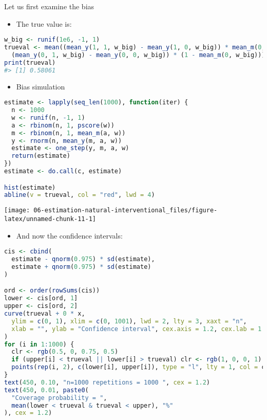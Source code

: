 \documentclass[
  12pt,
]{book}
\providecommand{\tightlist}{%
  \setlength{\itemsep}{0pt}\setlength{\parskip}{0pt}}
\theoremstyle{definition}
\theoremstyle{definition}
\theoremstyle{definition}
\newcommand{\1}{\mathbbm{1}}
\begin{document}
Let us first examine the bias

\begin{itemize}
\tightlist
\item
  The true value is:
\end{itemize}

\begin{lstlisting}[language=R]
w_big <- runif(1e6, -1, 1)
trueval <- mean((mean_y(1, 1, w_big) - mean_y(1, 0, w_big)) * mean_m(0, w_big) +
  (mean_y(0, 1, w_big) - mean_y(0, 0, w_big)) * (1 - mean_m(0, w_big)))
print(trueval)
#> [1] 0.58061
\end{lstlisting}

\begin{itemize}
\tightlist
\item
  Bias simulation
\end{itemize}

\begin{lstlisting}[language=R]
estimate <- lapply(seq_len(1000), function(iter) {
  n <- 1000
  w <- runif(n, -1, 1)
  a <- rbinom(n, 1, pscore(w))
  m <- rbinom(n, 1, mean_m(a, w))
  y <- rnorm(n, mean_y(m, a, w))
  estimate <- one_step(y, m, a, w)
  return(estimate)
})
estimate <- do.call(c, estimate)

hist(estimate)
abline(v = trueval, col = "red", lwd = 4)
\end{lstlisting}

\begin{center}\texttt{[image: 06-estimation-natural-interventional\_files/figure-latex/unnamed-chunk-11-1]} \end{center}

\begin{itemize}
\tightlist
\item
  And now the confidence intervals:
\end{itemize}

\begin{lstlisting}[language=R]
cis <- cbind(
  estimate - qnorm(0.975) * sd(estimate),
  estimate + qnorm(0.975) * sd(estimate)
)

ord <- order(rowSums(cis))
lower <- cis[ord, 1]
upper <- cis[ord, 2]
curve(trueval + 0 * x,
  ylim = c(0, 1), xlim = c(0, 1001), lwd = 2, lty = 3, xaxt = "n",
  xlab = "", ylab = "Confidence interval", cex.axis = 1.2, cex.lab = 1.2
)
for (i in 1:1000) {
  clr <- rgb(0.5, 0, 0.75, 0.5)
  if (upper[i] < trueval || lower[i] > trueval) clr <- rgb(1, 0, 0, 1)
  points(rep(i, 2), c(lower[i], upper[i]), type = "l", lty = 1, col = clr)
}
text(450, 0.10, "n=1000 repetitions = 1000 ", cex = 1.2)
text(450, 0.01, paste0(
  "Coverage probability = ",
  mean(lower < trueval & trueval < upper), "%"
), cex = 1.2)
\end{lstlisting}
\end{document}
